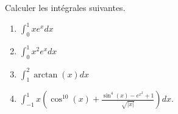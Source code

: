 
\begin{exercice}\label{exoTD5-0004}

	Calculer les intégrales suivantes.
	
		\begin{enumerate}
			\item
				$\displaystyle\int_0^1xe^xdx$
			\item
				$\displaystyle\int_0^1x^2e^xdx$
			\item
				$\displaystyle\int_1^2\arctan(x)dx$
			\item
				$\displaystyle\int_{-1}^1x\left( \cos^{10}(x)+\frac{ \sin^4(x)- e^{x^2}+1 }{ \sqrt{| x |} } \right)dx$.
		\end{enumerate}
	

\end{exercice}

